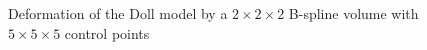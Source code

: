 \documentclass[3p]{elsarticle}
\begin{document}
\begin{figure}[htbp]
\begin{center}
\begin{minipage}[r]{0.44\textwidth}
		\caption{Deformation of the Doll model by a $2\times2\times2$ B-spline volume with $5\times5\times5$ control points}
		\label{fig:doll}
	\end{minipage}
\end{center}
\end{figure}
\end{document}
